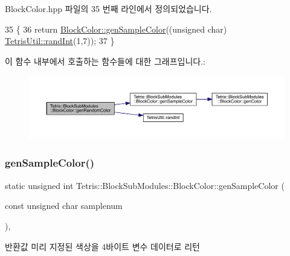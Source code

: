 Block\+Color.\+hpp 파일의 35 번째 라인에서 정의되었습니다.


\begin{DoxyCode}
35                                                 \{
36                 \textcolor{keywordflow}{return} \hyperlink{class_tetris_1_1_block_sub_modules_1_1_block_color_a624fe688c2889c345cb8dff757f06ef9}{BlockColor::genSampleColor}((\textcolor{keywordtype}{unsigned} \textcolor{keywordtype}{char})
      \hyperlink{class_tetris_util_a0a60e809425ddb416a500bcc03cf7061}{TetrisUtil::randInt}(1,7));
37             \}
\end{DoxyCode}
이 함수 내부에서 호출하는 함수들에 대한 그래프입니다.\+:
\nopagebreak
\begin{figure}[H]
\begin{center}
\leavevmode
\includegraphics[width=350pt]{de/d44/class_tetris_1_1_block_sub_modules_1_1_block_color_a74374a6d24cd77c7f4fe03e19111bab7_cgraph}
\end{center}
\end{figure}
\mbox{\label{class_tetris_1_1_block_sub_modules_1_1_block_color_a624fe688c2889c345cb8dff757f06ef9}} 
\subsubsection{\texorpdfstring{gen\+Sample\+Color()}{genSampleColor()}}
{\footnotesize\ttfamily static unsigned int Tetris\+::\+Block\+Sub\+Modules\+::\+Block\+Color\+::gen\+Sample\+Color (\begin{DoxyParamCaption}\item[{const unsigned char}]{samplenum }\end{DoxyParamCaption})\hspace{0.3cm}{\ttfamily [inline]}, {\ttfamily [static]}}

\begin{DoxyReturn}{반환값}
미리 지정된 색상을 4바이트 변수 데이터로 리턴 
\end{DoxyReturn}


